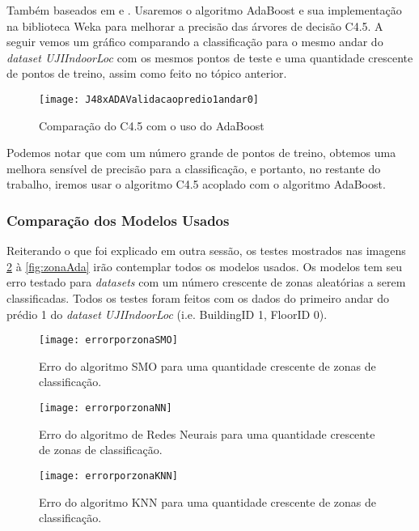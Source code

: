 Também baseados em \cite{comparative} e \cite{comparativeEN}. Usaremos o algoritmo AdaBoost  e sua implementação na biblioteca Weka para melhorar a precisão das árvores de decisão C4.5. A seguir vemos um gráfico comparando a classificação para o mesmo andar do \textit{dataset UJIIndoorLoc} com os mesmos pontos de teste e uma quantidade crescente de pontos de treino, assim como feito no tópico anterior.


\begin{figure}[!h]
\centering
\caption{Comparação do C4.5 com o uso do AdaBoost}
 \texttt{[image: J48xADAValidacaopredio1andar0]}
\label{fig:comparisonC4.5andAdaBoost}  
\end{figure}


Podemos notar que com um número grande de pontos de treino, obtemos uma melhora sensível de precisão para a classificação, e portanto, no restante do trabalho, iremos usar o algoritmo C4.5 acoplado com o algoritmo AdaBoost.



\subsubsection{Comparação dos Modelos Usados}


Reiterando o que foi explicado em outra sessão, os testes mostrados nas imagens \ref{fig:zonaSMO} à \ref{fig:zonaAda} irão contemplar todos os modelos usados. Os modelos tem seu erro testado para \textit{datasets} com um número crescente de zonas aleatórias a serem classificadas. Todos os testes foram feitos com os dados do primeiro andar do prédio 1 do \textit{dataset UJIIndoorLoc }(i.e. BuildingID 1, FloorID 0).


\begin{figure}[H]
	\centering
	\caption{Erro do algoritmo SMO  para uma quantidade crescente de zonas de classificação.}
  \texttt{[image: errorporzonaSMO]}
\label{fig:zonaSMO}

\end{figure}



\begin{figure}[H]
	\centering
	\caption{Erro do algoritmo de Redes Neurais  para uma quantidade crescente de zonas de classificação.}
  \texttt{[image: errorporzonaNN]}
\label{fig:zonaNN}

\end{figure}


\begin{figure}[H]
	\centering
	\caption{Erro do algoritmo KNN para uma quantidade crescente de zonas de classificação.}
  \texttt{[image: errorporzonaKNN]}
\label{fig:zonaKNN}

\end{figure}



